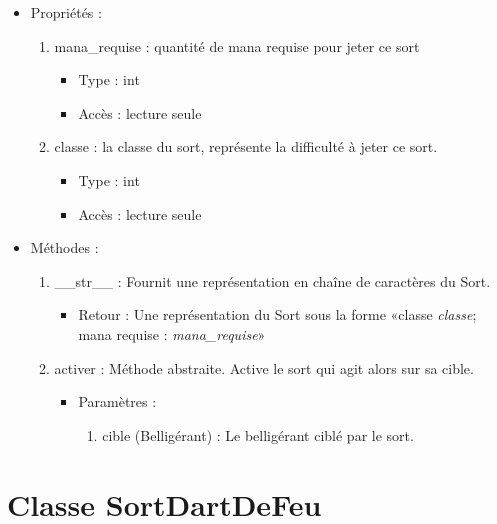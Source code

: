 \documentclass[12pt,pdftex,oneside]{article}
\begin{document}
  \begin{itemize}
  \item Propriétés : 
    \begin{enumerate}
    \item mana\_requise : quantité de mana requise pour jeter ce sort
          \begin{itemize}
          \item Type : int
          \item Accès : lecture seule
          \end{itemize}
    \item classe : la classe du sort, représente la difficulté à jeter ce sort.
          \begin{itemize}
          \item Type : int
          \item Accès : lecture seule
          \end{itemize}

    \end{enumerate}

  \item Méthodes : 

    \begin{enumerate}
    \item \_\_str\_\_ : Fournit une représentation en chaîne de caractères du Sort.
      \begin{itemize}
      \item Retour : Une représentation du Sort sous la forme «classe \emph{classe}; mana requise : \emph{mana\_requise}»
      \end{itemize}
    \item activer : Méthode abstraite. Active le sort qui agit alors sur sa cible.
      \begin{itemize}
      \item Paramètres : 
        \begin{enumerate}
        \item cible (Belligérant) : Le belligérant ciblé par le sort.
        \end{enumerate}
      \end{itemize}

    \end{enumerate}

  \end{itemize}


  \section {Classe SortDartDeFeu}
\end{document}
